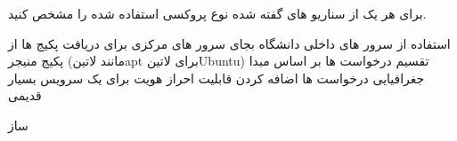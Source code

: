 \documentclass{../assignment}
\begin{document}

برای هر یک از سناریو های گفته شده نوع پروکسی استفاده شده را مشخص کنید.

 استفاده از سرور های داخلی دانشگاه بجای سرور های مرکزی برای دریافت پکیج ها از پکیج منیجر (مانند ‌لاتین{apt} برای ‌لاتین{Ubuntu})
 تقسیم درخواست ها بر اساس مبدا جغرافیایی درخواست ها
 اضافه کردن قابلیت احراز هویت برای یک سرویس بسیار قدیمی





‌ساز
\end{document}
